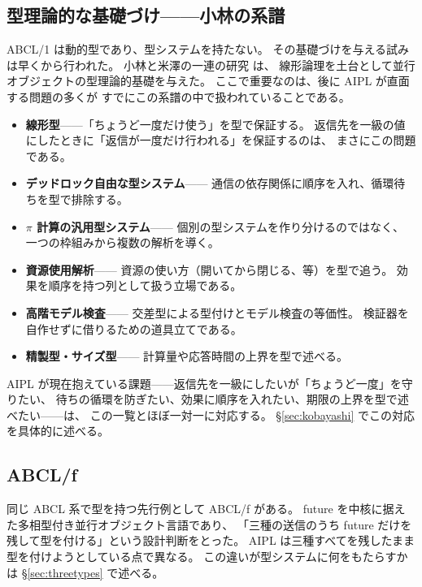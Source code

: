 \documentclass[11pt,a4paper]{ltjsarticle}
\theoremstyle{definition}
\theoremstyle{remark}
\begin{document}
\subsection{型理論的な基礎づけ——小林の系譜}
\label{sec:kobabg}

ABCL/1 は動的型であり、型システムを持たない。
その基礎づけを与える試みは早くから行われた。
小林と米澤の一連の研究\cite{kobayashi94,acl93,async92} は、
線形論理を土台として並行オブジェクトの型理論的基礎を与えた。
ここで重要なのは、後に AIPL が直面する問題の多くが
すでにこの系譜の中で扱われていることである。

\begin{itemize}
\item \textbf{線形型}\cite{kptl96}——「ちょうど一度だけ使う」を型で保証する。
      返信先を一級の値にしたときに「返信が一度だけ行われる」を保証するのは、
      まさにこの問題である。
\item \textbf{デッドロック自由な型システム}\cite{kobadf97,kobadf00,kobadf06}——
      通信の依存関係に順序を入れ、循環待ちを型で排除する。
\item \textbf{$\pi$ 計算の汎用型システム}\cite{kobagen01}——
      個別の型システムを作り分けるのではなく、
      一つの枠組みから複数の解析を導く。
\item \textbf{資源使用解析}\cite{kobares}——
      資源の使い方（開いてから閉じる、等）を型で追う。
      効果を順序を持つ列として扱う立場である。
\item \textbf{高階モデル検査}\cite{koba09,ko09}——
      交差型による型付けとモデル検査の等価性。
      検証器を自作せずに借りるための道具立てである。
\item \textbf{精製型・サイズ型}\cite{kobasize}——
      計算量や応答時間の上界を型で述べる。
\end{itemize}

AIPL が現在抱えている課題——返信先を一級にしたいが「ちょうど一度」を守りたい、
待ちの循環を防ぎたい、効果に順序を入れたい、期限の上界を型で述べたい——は、
この一覧とほぼ一対一に対応する。
\S\ref{sec:kobayashi} でこの対応を具体的に述べる。

\subsection{ABCL/f}

同じ ABCL 系で型を持つ先行例として ABCL/f\cite{abclf} がある。
future を中核に据えた多相型付き並行オブジェクト言語であり、
「三種の送信のうち future だけを残して型を付ける」という設計判断をとった。
AIPL は三種すべてを残したまま型を付けようとしている点で異なる。
この違いが型システムに何をもたらすかは \S\ref{sec:threetypes} で述べる。
\end{document}
